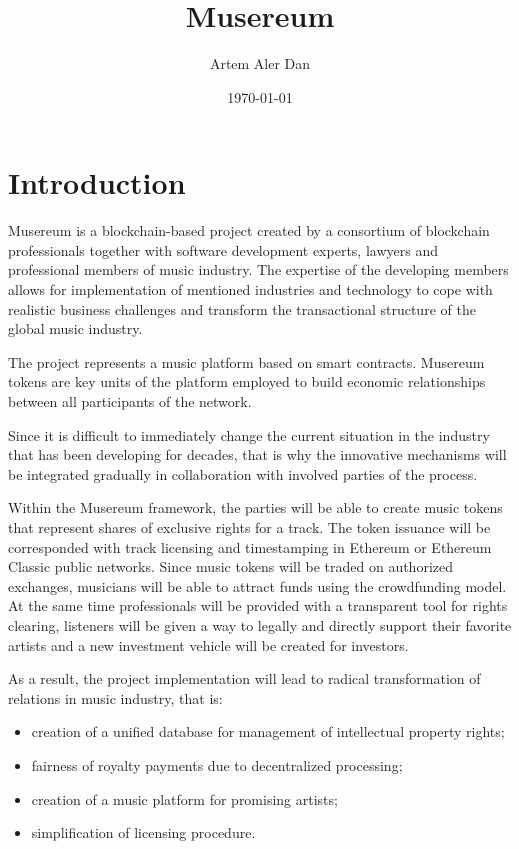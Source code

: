 \documentclass[12pt]{report}
\title{Musereum}
\author{Artem Aler Dan}
\date{\today}
\begin{document}
\maketitle
\pagebreak
\tableofcontents
\pagebreak

\chapter{Introduction}
\label{overview}
\begin{multicols}{2}
Musereum is a blockchain-based project created by a consortium of blockchain professionals together with software development experts, lawyers and professional members of music industry. The expertise of the developing members allows for implementation of mentioned industries and technology to cope with realistic business challenges and transform the transactional structure of the global music industry.

The project represents a music platform based on smart contracts. Musereum tokens are key units of the platform employed to build economic relationships between all participants of the network.

Since it is difficult to immediately change the current situation in the industry that has been developing for decades, that is why the innovative mechanisms will be integrated gradually in collaboration with involved parties of the process.

Within the Musereum framework, the parties will be able to create music tokens that represent shares of exclusive rights for a track. The token issuance will be corresponded with track licensing and timestamping in Ethereum or Ethereum Classic public networks. Since music tokens will be traded on authorized exchanges, musicians will be able to attract funds using the crowdfunding model. At the same time professionals will be provided with a transparent tool for rights clearing, listeners will be given a way to legally and directly support their favorite artists and a new investment vehicle will be created for investors.

As a result, the project implementation will lead to radical transformation of relations in music industry, that is:

\begin{itemize}
	\item  creation of a unified database for management of intellectual property rights;
	\item fairness of royalty payments due to decentralized processing;
	\item creation of a music platform for promising artists;
	\item simplification of licensing procedure.
\end{itemize}
\end{multicols}
\end{document}
